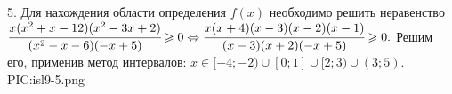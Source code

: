5. Для нахождения области определения $f(x)$ необходимо решить неравенство\\ $\cfrac{x(x^2+x-12)(x^2-3x+2)}{(x^2-x-6)(-x+5)}\geqslant0
\Leftrightarrow \cfrac{x(x+4)(x-3)(x-2)(x-1)}{(x-3)(x+2)(-x+5)}\geqslant0.$ Решим его, применив метод интервалов:
$x\in[-4;-2)\cup[0;1]\cup[2;3)\cup(3;5).$
{{PIC:isl9-5.png}}\\
